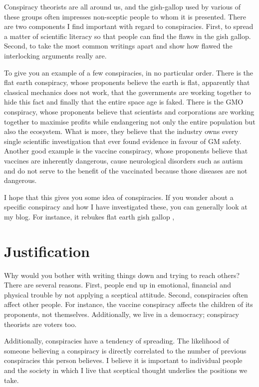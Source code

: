 \begin{multicols}{2}
Conspiracy theorists are all around us, and the gish-gallop used by various of these groups often impresses non-sceptic people to whom it is presented.
There are two components I find important with regard to conspiracies. First, to spread a matter of scientific literacy so that people can find the
flaws in the gish gallop. Second, to take the most common writings apart and show how flawed the interlocking arguments really are.


To give you an example of a few conspiracies, in no particular order. There is the flat earth conspiracy, whose proponents believe the earth is flat,
apparently that classical mechanics does not work, that the governments are working together to hide this fact and finally that the entire space age
is faked. There is the GMO conspiracy, whose proponents believe that scientists and corporations are working together to maximise profits while endangering
not only the entire population but also the ecosystem. What is more, they believe that the industry owns every single scientific investigation that
ever found evidence in favour of GM safety. Another good example is the vaccine conspiracy, whose proponents believe that vaccines are inherently dangerous,
cause neurological disorders such as autism and do not serve to the benefit of the vaccinated because those diseases are not dangerous.


I hope that this gives you some idea of conspiracies. If you wonder about a specific conspiracy and how I have investigated these, you can generally
look at my blog. For instance, it rebukes flat earth gish gallop \cite{blogfe},


\section{Justification}

Why would you bother with writing things down and trying to reach others? There are several reasons. First, people end up in emotional, financial
and physical trouble by not applying a sceptical attitude. Second, conspiracies often affect other people. For instance, the vaccine conspiracy
affects the children of its proponents, not themselves. Additionally, we live in a democracy; conspiracy theorists are voters too.


Additionally, conspiracies have a tendency of spreading. The likelihood of someone believing a conspiracy is directly correlated to the number of
previous conspiracies this person believes. I believe it is important to individual people and the society in which I live that sceptical thought
underlies the positions we take. 
	


\end{multicols}
